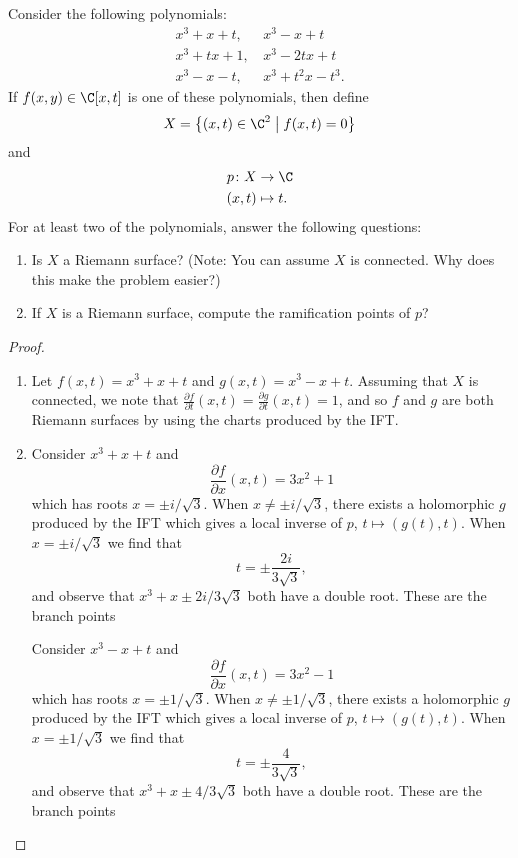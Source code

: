 \documentclass[10pt]{amsart}
\begin{document}
\begin{thm}
  Consider the following polynomials:
  \begin{align*}
    x^3 + x + t,\, &x^3 - x + t\\
    x^3 + tx + 1,\, &x^3 - 2tx + t\\
    x^3 - x - t,\, &x^3 + t^2x - t^3.
  \end{align*}
  If $f(x,y) \in \C[x,t]$ is one of these polynomials, then define
  $$X = \left\{ (x,t) \in \C^2 \;\middle\vert\; f(x,t) = 0\right\}$$
  and
  \begin{align*}
    p \colon X &\rightarrow \C\\
    (x,t) & \mapsto t.
  \end{align*}
  For at least two of the polynomials, answer the following questions:
  \begin{enumerate}
  \item
    Is $X$ a Riemann surface?
    (Note: You can assume $X$ is connected.  Why does this make the problem easier?)
  \item
    If $X$ is a Riemann surface, compute the ramification points of $p$?
  \end{enumerate}

  \begin{proof}
    \begin{enumerate}
    \item
      Let $f(x,t) = x^3 + x + t$ and $g(x,t) = x^3 - x + t$.
      Assuming that $X$ is connected, we note that $\frac{\partial{f}}{\partial t}(x,t) = \frac{\partial{g}}{\partial t}(x,t) = 1$, and so $f$ and $g$ are both Riemann surfaces by using the charts produced by the IFT.
    \item
      Consider $x^3 + x + t$ and
      $$\frac{\partial{f}}{\partial x}(x,t) = 3x^2 + 1$$
      which has roots $x = \pm i/\sqrt{3}$.
      When $x \neq \pm i/\sqrt{3}$, there exists a holomorphic $g$ produced by the IFT which gives a local inverse of $p$, $t \mapsto (g(t), t)$.
      When $x = \pm i/\sqrt{3}$ we find that
      $$t = \pm\frac{2i}{3\sqrt{3}},$$
      and observe that $x^3 + x \pm 2i/3\sqrt{3}$ both have a double root.
      These are the branch points 

      Consider $x^3 - x + t$ and
      $$\frac{\partial{f}}{\partial x}(x,t) = 3x^2 - 1$$
      which has roots $x = \pm 1/\sqrt{3}$.
      When $x \neq \pm 1/\sqrt{3}$, there exists a holomorphic $g$ produced by the IFT which gives a local inverse of $p$, $t \mapsto (g(t), t)$.
      When $x = \pm 1/\sqrt{3}$ we find that
      $$t = \pm\frac{4}{3\sqrt{3}},$$
      and observe that $x^3 + x \pm 4/3\sqrt{3}$ both have a double root.
      These are the branch points 
    \end{enumerate}
  \end{proof}
\end{thm}
\end{document}
